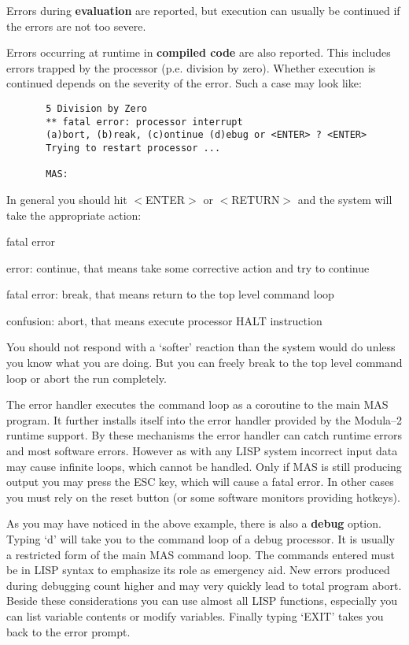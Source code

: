 Errors during {\bf evaluation} are reported, 
but execution can usually be continued
if the errors are not too severe. 

Errors occurring at runtime in {\bf compiled code} are also reported.
This includes errors trapped by the processor (p.e. division by zero).
Whether execution is continued depends on the severity of the error.
Such a case may look like:

\begin{verbatim}
       5 Division by Zero 
       ** fatal error: processor interrupt 
       (a)bort, (b)reak, (c)ontinue (d)ebug or <ENTER> ? <ENTER>
       Trying to restart processor ...

       MAS: 
\end{verbatim}
  
In general you should hit $<$ENTER$>$ or $<$RETURN$>$ and the system will
take the appropriate action: 

\begin{deflist}{fatal error}
\item[error\index{error}:] continue, that means take some corrective action
                           and try to continue
\item[fatal error\index{fatal error}:] break, that means return to the 
                top level command loop
\item[confusion\index{confusion}:]  abort, that means execute processor 
                                 HALT instruction 
\end{deflist}

You should not respond with a `softer' reaction than the system 
would do unless you know what you are doing. 
But you can freely break to the top level command 
loop or abort the run completely.  
  
The error handler executes the command loop as a coroutine to the
main MAS program. It further installs itself into the error handler
provided by the Modula--2 runtime support. By these mechanisms the 
error handler can catch runtime errors and most software errors.
However as with any LISP system incorrect input data may
cause infinite loops, which cannot be handled. Only if MAS is 
still producing output you may press the ESC key, which will cause a 
fatal error.
In other cases you must rely on the reset button (or some software 
monitors providing hotkeys).

As you may have noticed in the above example, there is also a
{\bf debug} option. Typing `d' will take you to the command loop
of a debug processor. It is usually a restricted form of
the main MAS command loop. The commands entered must be in 
LISP syntax to emphasize its role as 
emergency aid. New errors 
produced during debugging count higher and may 
very quickly lead to total program abort. 
Beside these considerations you can use almost all LISP functions,
especially you can list variable contents or modify variables.
Finally typing `EXIT' takes you back to the 
error prompt.  


